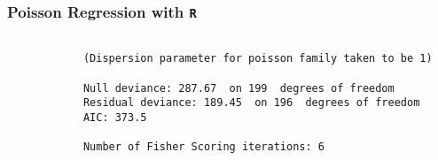 \documentclass[MASTER.tex]{subfiles}
\begin{document}
	\begin{frame}[fragile]
		
		\frametitle{Poisson Regression with \texttt{R}}
		\large
		\begin{framed}
			\begin{verbatim}
			
			(Dispersion parameter for poisson family taken to be 1)
			
			Null deviance: 287.67  on 199  degrees of freedom
			Residual deviance: 189.45  on 196  degrees of freedom
			AIC: 373.5
			
			Number of Fisher Scoring iterations: 6
			
			\end{verbatim}
		\end{framed}
	\end{frame}
	
\end{document}
